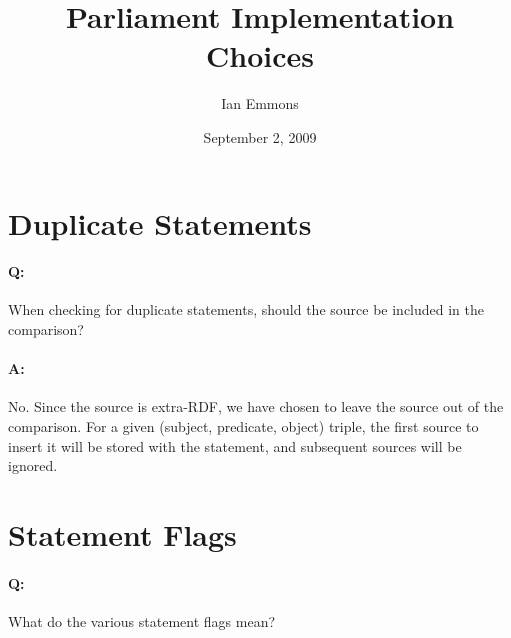 \documentclass[12pt,letterpaper,draft]{article}
\title{Parliament Implementation Choices}
\author{Ian Emmons}
\date{September 2, 2009}
\begin{document}
\maketitle

\section*{Duplicate Statements}

\paragraph{Q:}When checking for duplicate statements, should the source be included in the comparison?

\paragraph{A:}No.  Since the source is extra-RDF, we have chosen to leave the source out of the comparison.  For a given (subject, predicate, object) triple, the first source to insert it will be stored with the statement, and subsequent sources will be ignored.

\section*{Statement Flags}

\paragraph{Q:}What do the various statement flags mean?
\end{document}
